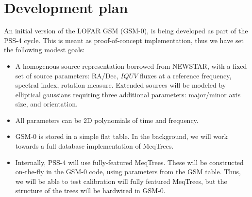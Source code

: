 \documentclass[11pt,twoside]{article}  %
\begin{document}
\section{Development plan}

An initial version of the LOFAR GSM (GSM-0), is being developed as part of
the PSS-4 cycle. This is meant as proof-of-concept implementation, thus we have
set the following modest goals:

\begin{itemize}

\item A homogenous source representation borrowed from NEWSTAR, with a fixed
set of source parameters: RA/Dec, $IQUV$ fluxes at a reference frequency,
spectral index, rotation measure. Extended sources will be modeled  by
elliptical gaussians requiring three additional parameters: major/minor axis
size, and orientation. 

\item All parameters can be 2D polynomials of time and frequency.

\item GSM-0 is stored in a simple flat table. In the background, we will work
towards a full database implementation of MeqTrees.

\item Internally, PSS-4 will use fully-featured MeqTrees. These will be
constructed on-the-fly in the GSM-0 code, using parameters from the GSM table.
Thus, we will be able to test calibration will fully featured MeqTrees, but the
structure of the trees will be hardwired in GSM-0.

\end{itemize}
\end{document}
